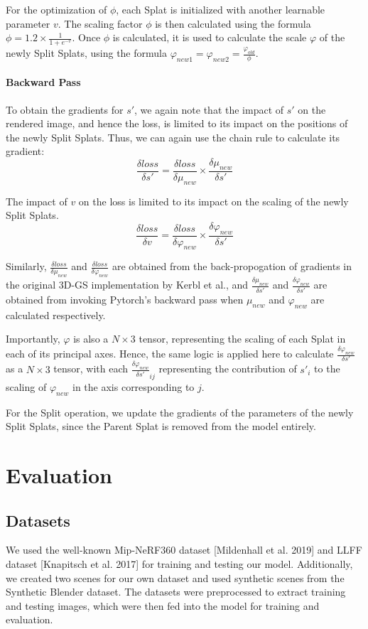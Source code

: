 \documentclass[11pt]{report}
\begin{document}
For the optimization of $\phi$, each Splat is initialized with another learnable parameter $v$. The scaling factor $\phi$ is then calculated using the formula $\phi = 1.2 \times \frac{1}{1 + e^{-v}}$. Once $\phi$ is calculated, it is used to calculate the scale $\varphi$ of the newly Split Splats, using the formula $\varphi_{new1} =  \varphi_{new2} = \frac{\varphi_{old}}{\phi}$.

\subsubsection{Backward Pass}
To obtain the gradients for $s'$, we again note that the impact of $s'$ on the rendered image, and hence the loss, is limited to its impact on the positions of the newly Split Splats. Thus, we can again use the chain rule to calculate its gradient:
\[ \frac{\delta loss}{\delta s'} = \frac{\delta loss}{\delta \mu_{new}} \times \frac{\delta \mu_{new}}{\delta s'} \]

The impact of $v$ on the loss is limited to its impact on the scaling of the newly Split Splats.
\[ \frac{\delta loss}{\delta v} = \frac{\delta loss}{\delta \varphi_{new}} \times \frac{\delta \varphi_{new}}{\delta s'} \]

Similarly, $\frac{\delta loss}{\delta \mu_{new}}$ and $\frac{\delta loss}{\delta \varphi_{new}}$ are obtained from the back-propogation of gradients in the original 3D-GS implementation by Kerbl et al., and $\frac{\delta \mu_{new}}{\delta s'}$ and $\frac{\delta \varphi_{new}}{\delta s'}$ are obtained from invoking Pytorch's backward pass when $\mu_{new}$ and $\varphi_{new}$ are calculated respectively.

Importantly, $\varphi$ is also a $N \times 3$ tensor, representing the scaling of each Splat in each of its principal axes. Hence, the same logic is applied here to calculate $\frac{\delta \varphi_{new}}{\delta s'}$ as a $N \times 3$ tensor, with each $\frac{\delta \varphi_{new}}{\delta s'}_{ij}$ representing the contribution of $s'_{i}$ to the scaling of $\varphi_{new}$ in the axis corresponding to $j$.

For the Split operation, we update the gradients of the parameters of the newly Split Splats, since the Parent Splat is removed from the model entirely.

\chapter{Evaluation}

\section{Datasets}
We used the well-known Mip-NeRF360 dataset [Mildenhall et al. 2019] and LLFF dataset [Knapitsch et al. 2017] for training and testing our model. Additionally, we created two scenes for our own dataset and used synthetic scenes from the Synthetic Blender dataset. The datasets were preprocessed to extract training and testing images, which were then fed into the model for training and evaluation.
\end{document}
